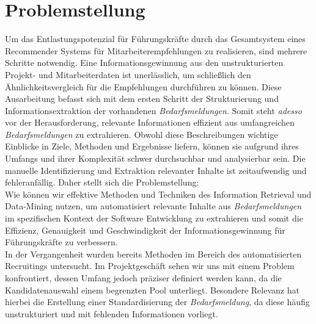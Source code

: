 \section{Problemstellung}
\label{sec:problemstellung}
Um das Entlastungspotenzial für Führungskräfte durch das Gesamtsystem eines Recommender Systems für Mitarbeiterempfehlungen zu realisieren, sind mehrere Schritte notwendig. Eine Informationsgewinnung aus den unstrukturierten Projekt- und Mitarbeiterdaten ist unerlässlich, um schließlich den Ähnlichkeitsvergleich für die Empfehlungen durchführen zu können. Diese Ausarbeitung befasst sich mit dem ersten Schritt der Strukturierung und Informationsextraktion der vorhandenen \emph{Bedarfsmeldungen}. Somit steht \emph{adesso} vor der Herausforderung, relevante Informationen effizient aus umfangreichen \emph{Bedarfsmeldungen} zu extrahieren. Obwohl diese Beschreibungen wichtige Einblicke in Ziele, Methoden und Ergebnisse liefern, können sie aufgrund ihres Umfangs und ihrer Komplexität schwer durchsuchbar und analysierbar sein. Die manuelle Identifizierung und Extraktion relevanter Inhalte ist zeitaufwendig und fehleranfällig. Daher stellt sich die Problemstellung: \\

Wie können wir effektive Methoden und Techniken des Information Retrieval und Data-Mining nutzen, um automatisiert relevante Inhalte aus \emph{Bedarfsmeldungen} im spezifischen Kontext der Software Entwicklung zu extrahieren und somit die Effizienz, Genauigkeit und Geschwindigkeit der Informationsgewinnung für Führungskräfte zu verbessern.\\

In der Vergangenheit wurden bereits Methoden im Bereich des automatisierten Recruitings untersucht. Im Projektgeschäft sehen wir uns mit einem Problem konfrontiert, dessen Umfang jedoch präziser definiert werden kann, da die Kandidatenauswahl einem begrenzten Pool unterliegt. Besondere Relevanz hat hierbei die Erstellung einer Standardisierung der \emph{Bedarfsmeldung}, da diese häufig unstrukturiert und mit fehlenden Informationen vorliegt.
